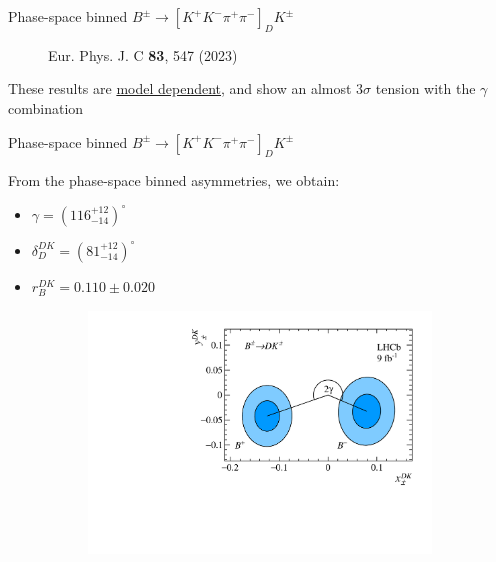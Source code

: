 \documentclass[dvipsnames]{beamer}
\begin{document}
\begin{frame}{Phase-space binned $B^\pm\to[K^+K^-\pi^+\pi^-]_DK^\pm$}
\begin{figure}[htb]
\begin{subfigure}{0.5\textwidth}
    \end{subfigure}
    \vspace{-0.5cm}
    \caption*{\tiny Eur. Phys. J. C \textbf{83}, 547 (2023)}
  \end{figure}
  \vspace{-0.5cm}
  \begin{center}
    {\large These results are \underline{model dependent}, and show an almost $3\sigma$ tension with the $\gamma$ combination}
  \end{center}
  \vspace{0.1cm}
\end{frame}

\begin{frame}{Phase-space binned $B^\pm\to[K^+K^-\pi^+\pi^-]_DK^\pm$}
  \begin{center}
    \large From the phase-space binned asymmetries, we obtain:
  \end{center}
  \begin{itemize}
    \item{$\gamma = (116^{+12}_{-14})^\circ$}
    \item{$\delta_D^{DK} = (81^{+12}_{-14})^\circ$}
    \item{$r_B^{DK} = 0.110 \pm 0.020$}
  \end{itemize}
  \vspace{-0.2cm}
  \begin{figure}[htb]
    \centering
    \begin{subfigure}{0.5\textwidth}
      \includegraphics[width=1\textwidth]{Plots/B2DK_CP_Observables_Contours.pdf}
    \end{subfigure}%
    \begin{subfigure}{0.5\textwidth}

\end{subfigure}
\end{figure}
\end{frame}
\end{document}
